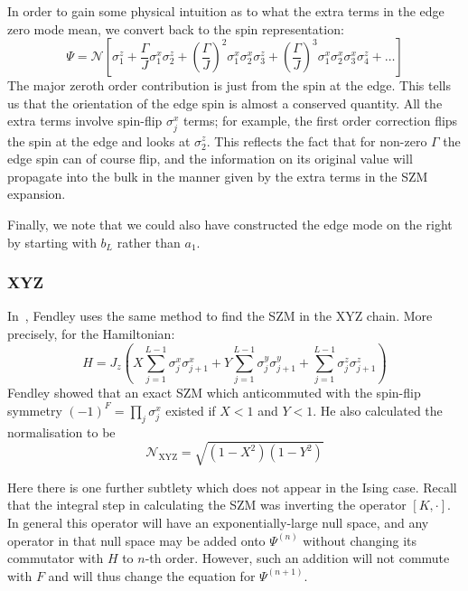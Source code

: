 \documentclass [a4paper, 11pt]{article}
\begin{document}
In order to gain some physical intuition as to what the extra terms in the edge zero mode mean, we convert back to the spin representation:
\begin{equation}
  \label{eq:pureisingpsi}
  \Psi  =\mathcal{N} \left[ \sigma^z_1 +  \frac{\Gamma}{J} \sigma^x_1 \sigma^z_2 +  \left(\frac{\Gamma}{J}\right)^2 \sigma^x_1 \sigma^x_2 \sigma^z_3 + \left(\frac{\Gamma}{J}\right)^3  \sigma^x_1 \sigma^x_2 \sigma^x_3\sigma^z_4+\ldots \right]
\end{equation}
The major zeroth order contribution is just from the spin at the edge. This tells us that the orientation of the edge spin is almost a conserved quantity. All the extra terms involve spin-flip $\sigma^x_j$ terms; for example, the first order correction flips the spin at the edge and looks at $\sigma^z_2$. This reflects the fact that for non-zero $\Gamma$ the edge spin can of course flip, and the information on its original value will propagate into the bulk in the manner given by the extra terms in the SZM expansion.

Finally, we note that we could also have constructed the edge mode on the right by starting with $b_L$ rather than $a_1$.

\subsubsection{XYZ}

In~\cite{XYZ}, Fendley uses the same method to find the SZM in the XYZ chain. More precisely, for the Hamiltonian:
\begin{equation}
  \label{eq:XYZ}
 H = J_z\left(X \sum_{j=1}^{L-1} \sigma^x_j \sigma^x_{j+1} + Y \sum_{j=1}^{L-1} \sigma^y_j  \sigma^y_{j+1} +\sum_{j=1}^{L-1} \sigma^z_j  \sigma^z_{j+1}   \right)
\end{equation}
Fendley showed that an exact SZM which anticommuted with the spin-flip symmetry $(-1)^F = \prod_j \sigma^x_j$ existed if $X < 1$ and $Y < 1$. He also calculated the normalisation to be
\begin{equation}
\label{eq:XYZnorm}
\mathcal{N}_\text{XYZ} = \sqrt{(1-X^2)(1-Y^2)}
\end{equation}

 Here there is one further subtlety which does not appear in the Ising case. Recall that the integral step in calculating the SZM was inverting the operator $[K, \cdot]$. In general this operator will have an exponentially-large null space, and any operator in that null space may be added onto $\Psi^{(n)}$ without changing its commutator with $H$ to $n$-th order. However, such an addition will not commute with $F$ and will thus change the equation for $\Psi^{(n+1)}$.
\end{document}
